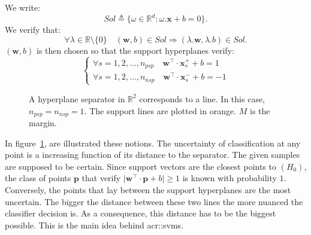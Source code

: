                 We write:
                \begin{equation*}
                    Sol \triangleq \{\omega \in \mathbb{R}^d : \omega.\bm{x} + b = 0\}.
                \end{equation*}
                We verify that:
                \begin{equation*}
                    \forall \lambda \in \mathbb{R}\setminus\{0\} \quad (\bm{w}, b) \in  Sol \Rightarrow (\lambda . \bm{w}, \lambda.b) \in Sol.
                \end{equation*}
                $(\bm{w}, b)$ is then chosen so that the support hyperplanes verify:
                \begin{equation}
                    \label{eq::support_lines}
                    \begin{cases}
                        \forall s=1,2,\dots,n_{psp} \quad \bm{w}^\intercal\cdot\bm{x}^+_s + b = 1\\              
                        \forall s=1,2,\dots,n_{nsp} \quad \bm{w}^\intercal\cdot\bm{x}^-_s + b = -1                
                    \end{cases}
                \end{equation}

                \begin{figure}
                    \centering
                    
                    \caption{
                        \label{fig::linear_separable} A hyperplane separator in $\mathbb{R}^2$ corresponds to a line.
                        In this case, $n_{psp} = n_{nsp} = 1$.
                        The support lines are plotted in orange.
                        $M$ is the margin.
                    }
                \end{figure}

                In figure~\ref{fig::linear_separable}, are illustrated these notions.
                The uncertainty of classification at any point is a increasing function of its distance to the separator.
                The given samples are supposed to be certain.
                Since support vectors are the  closest points to $(H_0)$, the class of points $\bm{p}$ that verify $\vert\bm{w}^\intercal\cdot\bm{p} + b\vert \geq 1$ is known with probability $1$.
                Conversely, the points that lay between the support hyperplanes are the most uncertain.
                The bigger the distance between these two lines the more nuanced the classifier decision is.
                As a consequence, this distance has to be the biggest possible.
                This is the main idea behind \glspl{acr::svm}.\\

